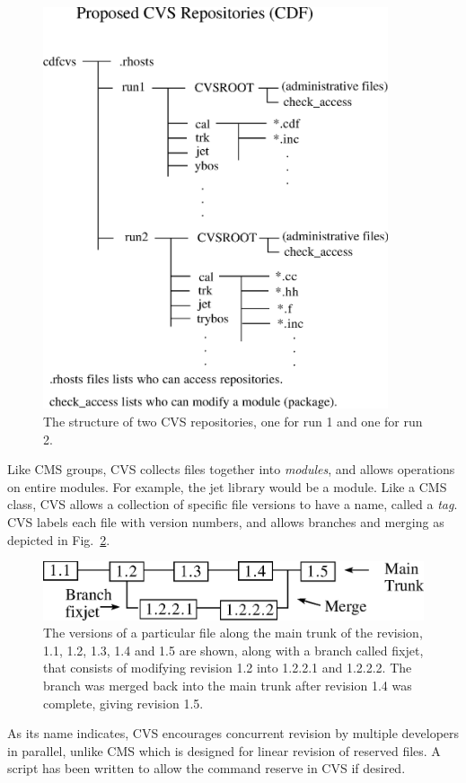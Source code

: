 \begin{figure}[tbh]
\begin{center}
\includegraphics[width=4.0in]{two_repositories.eps}
\end{center}   

\caption[CVS Repositories]{
The structure of two CVS repositories, one for run 1 and one
for run 2.}
\label{fig_repository}
\end{figure}

Like CMS groups, CVS collects files together into {\em modules}, and allows
operations on entire modules.  For example, the jet library would be a
module. Like a CMS class, CVS
allows a collection of specific file versions to have a name, called a
{\em tag}.  CVS labels each file with version
numbers, and allows branches and merging as depicted in Fig.~\ref{fig_branch}.
\begin{figure}[tbh]
\begin{center}
\includegraphics[width=6in]{cvs_revisions.eps}
\end{center}
\caption[Revisions, Branching and Merging]{
The versions of a particular file along the main trunk of the revision,
1.1, 1.2, 1.3, 1.4 and 1.5 are shown, along with a branch called {\ttfamily
fixjet},
that consists of modifying revision 1.2 into 1.2.2.1 and 1.2.2.2.  The
branch was merged back into the main trunk after revision 1.4 was complete,
giving revision 1.5.}
\label{fig_branch}
\end{figure}
As its name indicates, CVS encourages concurrent revision by multiple
developers in parallel, unlike CMS which is designed for linear revision of
reserved files.  A script has been written to allow the command {\ttfamily
reserve} in CVS if desired.

